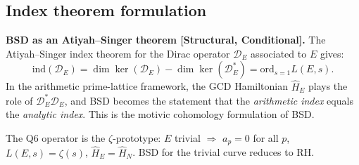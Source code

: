 \documentclass[12pt]{article}
\begin{document}
\subsection{Index theorem formulation}

\begin{tcolorbox}[keybox]
\textbf{BSD as an Atiyah--Singer theorem [Structural, Conditional].}
The Atiyah--Singer index theorem for the Dirac operator $\mathcal{D}_E$
associated to $E$ gives:
\[
  \mathrm{ind}(\mathcal{D}_E)
  = \dim\ker(\mathcal{D}_E) - \dim\ker(\mathcal{D}_E^*)
  = \mathrm{ord}_{s=1}L(E,s).
\]
In the arithmetic prime-lattice framework,
the GCD Hamiltonian $\hat{H}_E$ plays the role of $\mathcal{D}_E^*\mathcal{D}_E$,
and BSD becomes the statement that the \emph{arithmetic index} equals the \emph{analytic index}.
This is the motivic cohomology formulation of BSD.

The Q6 operator is the $\zeta$-prototype: $E$ trivial $\Rightarrow$
$a_p = 0$ for all $p$, $L(E,s) = \zeta(s)$, $\hat{H}_E = \hat{H}_N$.
BSD for the trivial curve reduces to RH.
\end{tcolorbox}
\end{document}
